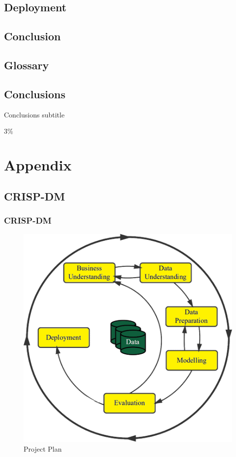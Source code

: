 \documentclass[
  american,
  10,
  a4paper,
]{book}
\theoremstyle{definition}
\theoremstyle{remark}
\begin{document}
\chapter{Deployment}\label{deployment}

\chapter{Conclusion}\label{conclusion}

\chapter*{Glossary}\label{glossary}


\chapter{Conclusions}\label{conclusions}

Conclusions subtitle

\hfill\break

3\%

\part{Appendix}

\chapter{CRISP-DM}\label{crisp-dm}

\section{CRISP-DM}\label{sec-crisp-dm}

\begin{figure}[H]

\caption{Project Plan}

{\centering \includegraphics[width=0.7\linewidth,height=\textheight,keepaspectratio]{nb/../images/crisp-dm.png}

}

\end{figure}%
\end{document}
